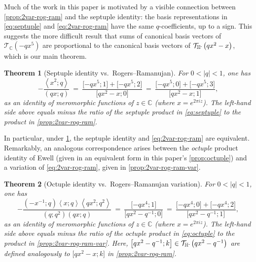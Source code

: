 \documentclass[reqno,11pt]{amsart}
\newtheorem{theorem}{Theorem}[section]
\theoremstyle{definition}
\theoremstyle{remark}
\numberwithin{equation}{section}
\newcommand{\C}{\mathbb{C}}
\newcommand{\Hminus}{{\mathbb{H}^{\textnormal{-}\hspace{-0.03cm}}}}
\newcommand{\mT}{\mathcal{T}}
\newcommand{\la}{\left\langle}
\newcommand{\ra}{\right\rangle}
\newcommand{\vect}[2]{\big[{#1};{#2}\big]}
\begin{document}
Much of the work in this paper is motivated by a visible connection between \cref{prop:2var-rog-ram} and the septuple identity: the basis representations in \cref{eq:septuple} and \cref{eq:2var-rog-ram} have the same $q$-coefficients, up to a sign. This suggests the more difficult result that sums of canonical basis vectors of $\mT_\C\left(-qx^5\right)$ are proportional to the canonical basis vectors of $\mT_\Hminus\left(qx^2-x\right)$, which is our main theorem.
\begin{theorem}[Septuple identity vs.\ Rogers--Ramanujan] \label{thm:bases-proportional}
For $0 < |q| < 1$, one has 
\[
    -\frac{\la x^2; q\ra}{(qx; q)} 
    \ =\  
    \frac{\vect{-qx^5}{1} + \vect{-qx^5}{2}}{\vect{qx^2 - x}{0}} \ =\  \frac{\vect{-qx^5}{0} + \vect{-qx^5}{3}}{\vect{qx^2 - x}{1}},
\]
as an identity of meromorphic functions of $z \in \C$ (where $x = e^{2\pi i z}$). The left-hand side above equals minus the ratio of the septuple product in \cref{eq:septuple} to the product in \cref{prop:2var-rog-ram}. %
\end{theorem}

In particular, under \cref{thm:bases-proportional}, the septuple identity and \cref{eq:2var-rog-ram} are equivalent. Remarkably, an analogous correspondence arises between the \emph{octuple} product identity of Ewell \cite{ewell1982octuple} (given in an equivalent form in this paper's \cref{prop:octuple}) and a variation of \cref{eq:2var-rog-ram}, given in \cref{prop:2var-rog-ram-var}.

\begin{theorem}[Octuple identity vs.\ Rogers--Ramanujan variation] \label{thm:bases-proportional-2}
For $0 < |q| < 1$, one has
\[
    -\frac{\left(-x^{-1}; q\right) \la x; q\ra \la qx^2; q^2 \ra }{(q; q^2)(qx; q)} 
    \ =\ \frac{\vect{-qx^4}{1}}{\vect{qx^2 - q^{-1}}{0}} \ =\  \frac{\vect{-qx^4}{0} + \vect{-qx^4}{2}}{\vect{qx^2 - q^{-1}}{1}},
\]
as an identity of meromorphic functions of $z \in \C$ (where $x = e^{2\pi i z}$). The left-hand side above equals minus the ratio of the octuple product in \cref{eq:octuple} to the product in \cref{prop:2var-rog-ram-var}. Here, $\vect{qx^2 - q^{-1}}{k} \in \mT_\Hminus\left( qx^2 - q^{-1}\right)$ are defined analogously to $\vect{qx^2 - x}{k}$ in \cref{prop:2var-rog-ram}. %
\end{theorem}
\end{document}
